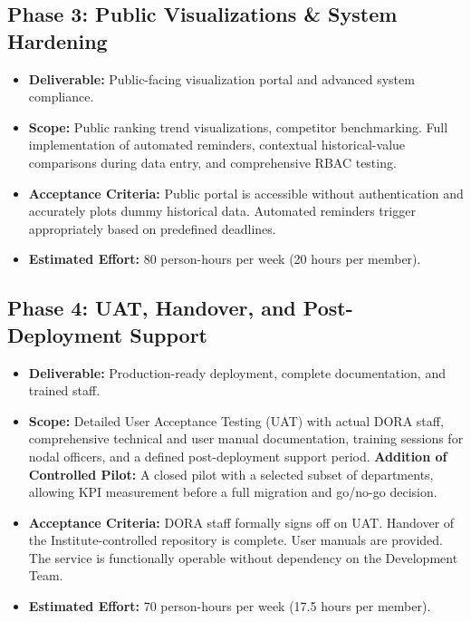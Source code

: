 \documentclass[11pt]{article}
\begin{document}
\subsection{Phase 3: Public Visualizations \& System Hardening}
\begin{itemize}[leftmargin=1.4em, itemsep=3pt]
\item \textbf{Deliverable:} Public-facing visualization portal and advanced system compliance.
\item \textbf{Scope:} Public ranking trend visualizations, competitor benchmarking. Full implementation of automated reminders, contextual historical-value comparisons during data entry, and comprehensive RBAC testing.
\item \textbf{Acceptance Criteria:} Public portal is accessible without authentication and accurately plots dummy historical data. Automated reminders trigger appropriately based on predefined deadlines.
\item \textbf{Estimated Effort:} 80 person-hours per week (20 hours per member).
\end{itemize}

\subsection{Phase 4: UAT, Handover, and Post-Deployment Support}
\begin{itemize}[leftmargin=1.4em, itemsep=3pt]
\item \textbf{Deliverable:} Production-ready deployment, complete documentation, and trained staff.
\item \textbf{Scope:} Detailed User Acceptance Testing (UAT) with actual DORA staff, comprehensive technical and user manual documentation, training sessions for nodal officers, and a defined post-deployment support period. \textbf{Addition of Controlled Pilot:} A closed pilot with a selected subset of departments, allowing KPI measurement before a full migration and go/no-go decision.
\item \textbf{Acceptance Criteria:} DORA staff formally signs off on UAT. Handover of the Institute-controlled repository is complete. User manuals are provided. The service is functionally operable without dependency on the Development Team.
\item \textbf{Estimated Effort:} 70 person-hours per week (17.5 hours per member).
\end{itemize}
\end{document}

